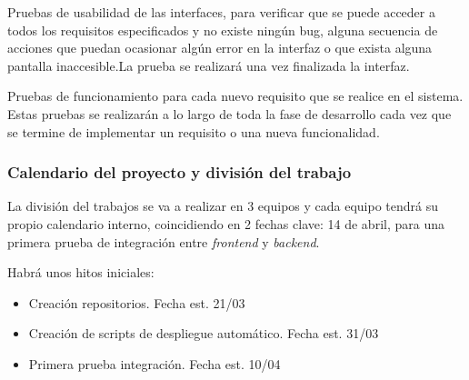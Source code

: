 \documentclass{article}
\begin{document}
Pruebas de usabilidad de las interfaces, para verificar que se puede acceder a todos los requisitos especificados y no existe ningún bug, alguna secuencia de acciones que puedan ocasionar algún error en la interfaz o que exista alguna pantalla inaccesible.La prueba se realizará una vez finalizada la interfaz.

Pruebas de funcionamiento para cada nuevo requisito que se realice en el sistema. Estas pruebas se realizarán a lo largo de toda la fase de desarrollo cada vez que se termine de implementar un requisito o una nueva funcionalidad.

\subsubsection{Calendario del proyecto y división del trabajo}


La división del trabajos se va a realizar en 3 equipos y cada equipo tendrá su propio calendario interno, coincidiendo en 2 fechas clave:
14 de abril, para una primera prueba de integración entre \textit{frontend} y \textit{backend}.

Habrá unos hitos iniciales:
\begin{itemize}
    \item Creación repositorios. Fecha est. 21/03
    \item Creación de scripts de despliegue automático. Fecha est. 31/03
    \item Primera prueba integración. Fecha est. 10/04
\end{itemize}
\end{document}
